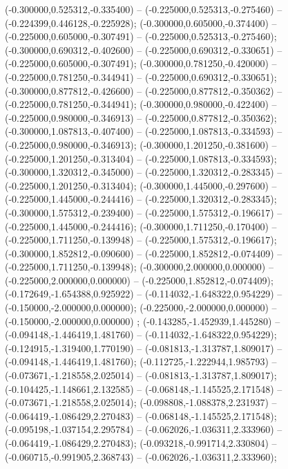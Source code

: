  (-0.300000,0.525312,-0.335400) -- (-0.225000,0.525313,-0.275460) -- (-0.224399,0.446128,-0.225928);
 (-0.300000,0.605000,-0.374400) -- (-0.225000,0.605000,-0.307491) -- (-0.225000,0.525313,-0.275460);
 (-0.300000,0.690312,-0.402600) -- (-0.225000,0.690312,-0.330651) -- (-0.225000,0.605000,-0.307491);
 (-0.300000,0.781250,-0.420000) -- (-0.225000,0.781250,-0.344941) -- (-0.225000,0.690312,-0.330651);
 (-0.300000,0.877812,-0.426600) -- (-0.225000,0.877812,-0.350362) -- (-0.225000,0.781250,-0.344941);
 (-0.300000,0.980000,-0.422400) -- (-0.225000,0.980000,-0.346913) -- (-0.225000,0.877812,-0.350362);
 (-0.300000,1.087813,-0.407400) -- (-0.225000,1.087813,-0.334593) -- (-0.225000,0.980000,-0.346913);
 (-0.300000,1.201250,-0.381600) -- (-0.225000,1.201250,-0.313404) -- (-0.225000,1.087813,-0.334593);
 (-0.300000,1.320312,-0.345000) -- (-0.225000,1.320312,-0.283345) -- (-0.225000,1.201250,-0.313404);
 (-0.300000,1.445000,-0.297600) -- (-0.225000,1.445000,-0.244416) -- (-0.225000,1.320312,-0.283345);
 (-0.300000,1.575312,-0.239400) -- (-0.225000,1.575312,-0.196617) -- (-0.225000,1.445000,-0.244416);
 (-0.300000,1.711250,-0.170400) -- (-0.225000,1.711250,-0.139948) -- (-0.225000,1.575312,-0.196617);
 (-0.300000,1.852812,-0.090600) -- (-0.225000,1.852812,-0.074409) -- (-0.225000,1.711250,-0.139948);
 (-0.300000,2.000000,0.000000) -- (-0.225000,2.000000,0.000000) -- (-0.225000,1.852812,-0.074409);
 (-0.172649,-1.654388,0.925922) -- (-0.114032,-1.648322,0.954229) -- (-0.150000,-2.000000,0.000000);
 (-0.225000,-2.000000,0.000000) -- (-0.150000,-2.000000,0.000000) ;
 (-0.143285,-1.452939,1.445280) -- (-0.094148,-1.446419,1.481760) -- (-0.114032,-1.648322,0.954229);
 (-0.124915,-1.319400,1.770190) -- (-0.081813,-1.313787,1.809017) -- (-0.094148,-1.446419,1.481760);
 (-0.112725,-1.222944,1.985793) -- (-0.073671,-1.218558,2.025014) -- (-0.081813,-1.313787,1.809017);
 (-0.104425,-1.148661,2.132585) -- (-0.068148,-1.145525,2.171548) -- (-0.073671,-1.218558,2.025014);
 (-0.098808,-1.088378,2.231937) -- (-0.064419,-1.086429,2.270483) -- (-0.068148,-1.145525,2.171548);
 (-0.095198,-1.037154,2.295784) -- (-0.062026,-1.036311,2.333960) -- (-0.064419,-1.086429,2.270483);
 (-0.093218,-0.991714,2.330804) -- (-0.060715,-0.991905,2.368743) -- (-0.062026,-1.036311,2.333960);
